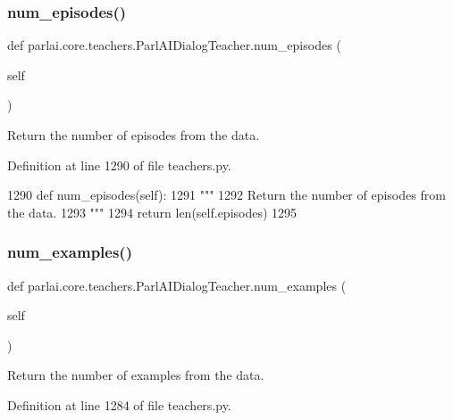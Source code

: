 \subsubsection{\texorpdfstring{num\+\_\+episodes()}{num\_episodes()}}
{\footnotesize\ttfamily def parlai.\+core.\+teachers.\+Parl\+A\+I\+Dialog\+Teacher.\+num\+\_\+episodes (\begin{DoxyParamCaption}\item[{}]{self }\end{DoxyParamCaption})}

\begin{DoxyVerb}Return the number of episodes from the data.
\end{DoxyVerb}
 

Definition at line 1290 of file teachers.\+py.


\begin{DoxyCode}
1290     \textcolor{keyword}{def }num\_episodes(self):
1291         \textcolor{stringliteral}{"""}
1292 \textcolor{stringliteral}{        Return the number of episodes from the data.}
1293 \textcolor{stringliteral}{        """}
1294         \textcolor{keywordflow}{return} len(self.episodes)
1295 
\end{DoxyCode}
\mbox{\label{classparlai_1_1core_1_1teachers_1_1ParlAIDialogTeacher_a37c1c62c52860da9c63d9f6ed23ae6ae}} 
\subsubsection{\texorpdfstring{num\+\_\+examples()}{num\_examples()}}
{\footnotesize\ttfamily def parlai.\+core.\+teachers.\+Parl\+A\+I\+Dialog\+Teacher.\+num\+\_\+examples (\begin{DoxyParamCaption}\item[{}]{self }\end{DoxyParamCaption})}

\begin{DoxyVerb}Return the number of examples from the data.
\end{DoxyVerb}
 

Definition at line 1284 of file teachers.\+py.


